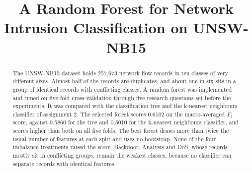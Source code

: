 \documentclass[conference,10pt]{IEEEtran}
\begin{document}
\title{A Random Forest for Network Intrusion Classification on UNSW-NB15}

\author{
}

\maketitle

\begin{abstract}

The UNSW-NB15 dataset holds 257,673 network flow records in ten classes of
very different sizes. Almost half of the records are duplicates, and about
one in six sits in a group of identical records with conflicting classes. A
random forest was implemented and tuned on five-fold cross-validation
through five research questions set before the experiments. It
was compared with the classification tree and the k-nearest neighbours
classifier of assignment 2. The selected forest scores 0.6102 on the
macro-averaged $F_1$ score, against 0.5860 for the tree and 0.5010 for the
k-nearest neighbours classifier, and scores higher than both on all five folds.
The best forest draws more than twice the usual number of features at each
split and uses no bootstrap. None of the four imbalance treatments
raised the score. Backdoor, Analysis and DoS, whose records mostly sit in
conflicting groups, remain the weakest classes, because
no classifier can separate records with identical features.
\end{abstract}
\end{document}
